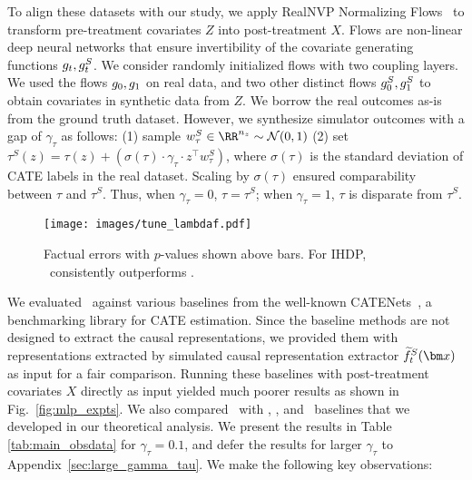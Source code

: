To align these datasets with our study, we apply RealNVP Normalizing Flows~\citep{realnvp} to transform pre-treatment covariates $Z$ into post-treatment $X$. Flows are non-linear deep neural networks that ensure invertibility of the covariate generating functions $\R_t, \S_t$. We consider randomly initialized flows with two coupling layers. We used the flows $\R_0, \R_1$ on real data, and two other distinct flows $\S_0, \S_1$ to obtain covariates in synthetic data from $Z$.
We borrow the real outcomes as-is from the ground truth dataset. However, we synthesize simulator outcomes with a gap of $\gamma_\tau$ as follows: (1) sample $w_\tau^S \in \RR^{n_z} \sim \mathcal{N}(0, 1)$ (2) set $\tau^S(z) = \tau(z) + (\sigma(\tau) \cdot \gamma_\tau \cdot z^\top w_\tau^S)$, where $\sigma(\tau)$ is the standard deviation of CATE labels in the real dataset. Scaling by $\sigma(\tau)$ ensured comparability between $\tau$ and $\tau^S$. Thus, when $\gamma_\tau = 0$, $\tau = \tau^S$; when $\gamma_\tau = 1$, $\tau$ is disparate from $\tau^S$. 


\begin{wrapfigure}{r}{0.35\textwidth} %
    \centering
    \vspace{-15pt} 
    \texttt{[image: images/tune\_lambdaf.pdf]} %
    \caption{\small{Factual errors with $p$-values shown above bars. For IHDP, \realonly\ consistently outperforms \muonly.}}
    \vspace{-15pt} 
    \label{fig:valid_fct}
\end{wrapfigure}

We evaluated \our\ against various baselines from the well-known CATENets~\citep{benchmarking}, a benchmarking library for CATE estimation. Since the baseline methods are not designed to extract the causal representations, we provided them with representations extracted by simulated causal representation extractor $\SInvCont_t(\xb)$ as input for a fair comparison. Running these baselines with post-treatment covariates $X$ directly as input yielded much poorer results as shown in Fig.~\ref{fig:mlp_expts}. We also compared \our\ with \simonly, \realonly, and \muonly\ baselines that we developed in our theoretical analysis. We present the results  in Table \ref{tab:main_obsdata} for $\gamma_\tau = 0.1$, and defer the results for larger $\gamma_\tau$ to Appendix~\ref{sec:large_gamma_tau}. We make the following key observations:


